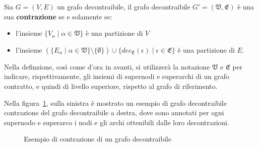     \begin{definition}
        Sia $G = (V, E)$ un grafo decontraibile, il grafo decontraibile
        $G\mathcal{'} = (\mathfrak{V}, \mathfrak{E})$ \`e una sua \textbf{contrazione} se e solamente se:
            \begin{itemize}
                \item l'insieme $\{V_\alpha \mid \alpha \in \mathfrak{V}\}$ \`e una partizione di $V$
                \item l'insieme $(\{E_\alpha \mid \alpha \in \mathfrak{V}\} \setminus \{ \emptyset \}) \cup
                    \{ dec_{\mathfrak{E}}(\epsilon) \mid \epsilon \in \mathfrak{E}\}$ \`e una partizione di $E$.
            \end{itemize}
    \end{definition}

    Nella definzione, cos\`{i} come d'ora in avanti, si utilizzer\`a la notazione $\mathfrak{V}$ e $\mathfrak{E}$ per
    indicare, rispettivamente, gli insiemi di supernodi e superarchi di un grafo contratto, e quindi di livello
    superiore, rispetto al grafo di riferimento. \newline

    Nella figura~\ref{fig:contraction-example}, sulla sinistra \`e mostrato un esempio di grafo decontraibile
    contrazione del grafo decontraibile a destra, dove sono annotati per ogni supernodo e superarco
    i nodi e gli archi ottenibili dalle loro decontrazioni. \newline

    \begin{figure}
        \centering
        
        \caption{Esempio di contrazione di un grafo decontraibile}
        \label{fig:contraction-example}
    \end{figure}

